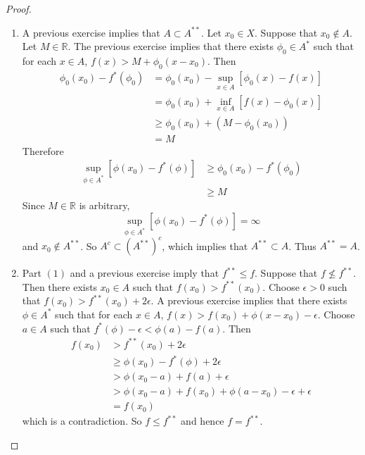 \documentclass[12pt]{amsart}
\theoremstyle{definition}
\newcommand{\ep}{\epsilon}
\newcommand{\R}{\mathbb{R}}
\DeclareMathOperator*{\0}{\mbf{0}}
\DeclareMathOperator*{\1}{\mbf{1}}
\begin{document}
	\begin{proof}\
		\begin{enumerate}
			\item A previous exercise implies that $A \subset A^{**}$. Let $x_0 \in X$. Suppose that $x_0 \not \in A$. Let $M \in \R$. The previous exercise implies that there exists $\phi_0 \in A^*$ such that for each $x \in A$, $f(x) > M + \phi_0(x - x_0)$. Then 
			\begin{align*}
				\phi_0(x_0) - f^*(\phi_0) 
				&= \phi_0(x_0) - \sup_{x \in A}[\phi_0(x) - f(x)] \\
				&= \phi_0(x_0) + \inf_{x \in A}[f(x) - \phi_0(x)] \\
				& \geq \phi_0(x_0) + (M - \phi_0(x_0)) \\
				&= M
			\end{align*}
		Therefore 
		\begin{align*}
			\sup\limits_{\phi \in A^*}[\phi(x_0) - f^*(\phi)] 
			& \geq \phi_0(x_0) - f^*(\phi_0) \\
			& \geq M
		\end{align*}
		Since $M \in \R$ is arbitrary, $$\sup\limits_{\phi \in A^*}[\phi(x_0) - f^*(\phi)] = \infty $$ and $x_0 \not \in A^{**}$. So $A^c \subset (A^{**})^c$, which implies that $A^{**} \subset A$. Thus $A^{**} = A$.
		\item Part $(1)$ and a previous exercise imply that $f^{**} \leq f$. Suppose that $f \not \leq f^{**}$. Then there exists $x_0 \in A$ such that $f(x_0) > f^{**}(x_0)$. Choose $\ep > 0$ such that $f(x_0) > f^{**}(x_0) + 2 \ep$. A previous exercise implies that there exists $\phi \in A^*$ such that for each $x \in A$, $f(x) > f(x_0) + \phi(x - x_0) - \ep$. Choose $a \in A$ such that $f^*(\phi) - \ep < \phi(a) - f(a)$. Then 
		\begin{align*}
			f(x_0)
			& > f^{**}(x_0) + 2 \ep \\
			& \geq \phi(x_0) - f^*(\phi) + 2 \ep \\
			& > \phi(x_0 -a) + f(a) + \ep \\
			& > \phi(x_0 -a) + f(x_0) + \phi(a - x_0) - \ep + \ep \\
			&= f(x_0) 
		\end{align*}
		which is a contradiction. So $f \leq f^{**}$ and hence $f = f^{**}$. 
		\end{enumerate}
		
	\end{proof}
	

	
	
\end{document}
